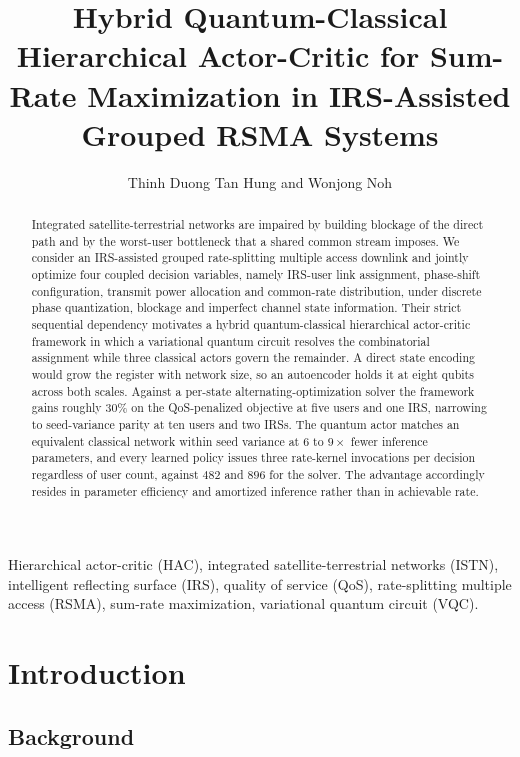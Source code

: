 \documentclass[12pt,onecolumn]{IEEEtran}
\title{\LARGE 
Hybrid Quantum-Classical Hierarchical Actor-Critic for Sum-Rate Maximization in IRS-Assisted Grouped RSMA Systems
}
\author{Thinh Duong Tan Hung and Wonjong Noh}
\begin{document}
\maketitle

\begin{abstract}
Integrated satellite-terrestrial networks are impaired by building blockage of the direct
path and by the worst-user bottleneck that a shared common stream imposes. We consider an
IRS-assisted grouped rate-splitting multiple access downlink and jointly optimize four
coupled decision variables, namely IRS-user link assignment, phase-shift configuration,
transmit power allocation and common-rate distribution, under discrete phase quantization,
blockage and imperfect channel state information. Their strict sequential dependency
motivates a hybrid quantum-classical hierarchical actor-critic framework in which a
variational quantum circuit resolves the combinatorial assignment while three classical
actors govern the remainder. A direct state encoding would grow the register with network
size, so an autoencoder holds it at eight qubits across both scales. Against a per-state
alternating-optimization solver the framework gains roughly $30\%$ on the QoS-penalized
objective at five users and one IRS, narrowing to seed-variance parity at ten users and two
IRSs. The quantum actor matches an equivalent classical network within seed variance at $6$
to $9\times$ fewer inference parameters, and every learned policy issues three rate-kernel
invocations per decision regardless of user count, against $482$ and $896$ for the solver.
The advantage accordingly resides in parameter efficiency and amortized inference rather
than in achievable rate.
\end{abstract}

\begin{IEEEkeywords}
Hierarchical actor-critic (HAC), integrated satellite-terrestrial networks (ISTN),
intelligent reflecting surface (IRS), quality of service (QoS), rate-splitting multiple
access (RSMA), sum-rate maximization, variational quantum circuit (VQC).
\end{IEEEkeywords}


\section{Introduction}

\subsection{Background}
\end{document}
